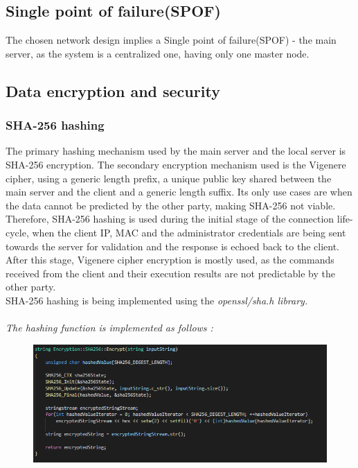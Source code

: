 \documentclass[runningheads]{llncs}
\begin{document}
\subsection{Single point of failure(SPOF)}
The chosen network design implies a Single point of failure(SPOF) - the main server, as the system is a centralized one, having only one master node.

\subsection{Data encryption and security}

\subsubsection{SHA-256 hashing}
The primary hashing mechanism used by the main server and the local server is SHA-256 encryption. The secondary encryption mechanism used is the Vigenere cipher, using a generic length prefix, a unique public key shared between the main server and the client and a generic length suffix. Its only use cases are when the data cannot be predicted by the other party, making SHA-256 not viable. Therefore, SHA-256 hashing is used during the initial stage of the connection life-cycle, when the client IP, MAC and the administrator credentials are being sent towards the server for validation and the response is echoed back to the client. After this stage, Vigenere cipher encryption is mostly used, as the commands received from the client and their execution results are not predictable by the other party.\\
SHA-256 hashing is being implemented using the \it {openssl/sha.h} library.\\\\
The hashing function is implemented as follows :\\
\begin{figure}[H]
\centering
\includegraphics[width=150mm]{SHA-256_Encryption.png}
\end{figure}
\end{document}
